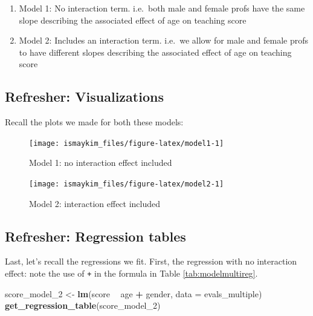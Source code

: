 \documentclass[12pt,]{krantz}
\makeatletter
\newenvironment{Shaded}{\begin{snugshade}}{\end{snugshade}}
\newcommand{\KeywordTok}[1]{\textcolor[rgb]{0.27,0.27,0.27}{\textbf{#1}}}
\newcommand{\DataTypeTok}[1]{\textcolor[rgb]{0.27,0.27,0.27}{#1}}
\newcommand{\DecValTok}[1]{\textcolor[rgb]{0.06,0.06,0.06}{#1}}
\newcommand{\StringTok}[1]{\textcolor[rgb]{0.5,0.5,0.5}{#1}}
\newcommand{\OperatorTok}[1]{\textcolor[rgb]{0.43,0.43,0.43}{\textbf{#1}}}
\newcommand{\NormalTok}[1]{#1}
\providecommand{\tightlist}{%
  \setlength{\itemsep}{0pt}\setlength{\parskip}{0pt}}
\newenvironment{kframe}{%
\medskip{}
\setlength{\fboxsep}{.8em}
 \def\at@end@of@kframe{}%
 \ifinner\ifhmode%
  \def\at@end@of@kframe{\end{minipage}}%
  \begin{minipage}{\columnwidth}%
 \fi\fi%
 \def\FrameCommand##1{\hskip\@totalleftmargin \hskip-\fboxsep
 \colorbox{shadecolor}{##1}\hskip-\fboxsep
     \hskip-\linewidth \hskip-\@totalleftmargin \hskip\columnwidth}%
 \MakeFramed {\advance\hsize-\width
   \@totalleftmargin\z@ \linewidth\hsize
   \@setminipage}}%
 {\par\unskip\endMakeFramed%
 \at@end@of@kframe}
\renewenvironment{Shaded}{\begin{kframe}}{\end{kframe}}
\theoremstyle{definition}
\theoremstyle{definition}
\theoremstyle{definition}
\theoremstyle{remark}
\makeatother
\begin{document}
\begin{enumerate}
\def\labelenumi{\arabic{enumi}.}
\tightlist
\item
  Model 1: No interaction term. i.e.~both male and female profs have the
  same slope describing the associated effect of age on teaching score
\item
  Model 2: Includes an interaction term. i.e.~we allow for male and
  female profs to have different slopes describing the associated effect
  of age on teaching score
\end{enumerate}

\subsection{Refresher: Visualizations}\label{refresher-visualizations}

Recall the plots we made for both these models:

\begin{figure}

{\centering \texttt{[image: ismaykim\_files/figure-latex/model1-1]} 

}

\caption{Model 1: no interaction effect included}\label{fig:model1}
\end{figure}

\begin{figure}

{\centering \texttt{[image: ismaykim\_files/figure-latex/model2-1]} 

}

\caption{Model 2: interaction effect included}\label{fig:model2}
\end{figure}

\subsection{Refresher: Regression
tables}\label{refresher-regression-tables}

Last, let's recall the regressions we fit. First, the regression with no
interaction effect: note the use of \texttt{+} in the formula in Table
\ref{tab:modelmultireg}.

\begin{Shaded}
\begin{Highlighting}[]
\NormalTok{score_model_}\DecValTok{2}\NormalTok{ <-}\StringTok{ }\KeywordTok{lm}\NormalTok{(score }\OperatorTok{~}\StringTok{ }\NormalTok{age }\OperatorTok{+}\StringTok{ }\NormalTok{gender, }\DataTypeTok{data =}\NormalTok{ evals_multiple)}
\KeywordTok{get_regression_table}\NormalTok{(score_model_}\DecValTok{2}\NormalTok{)}
\end{Highlighting}
\end{Shaded}
\end{document}
